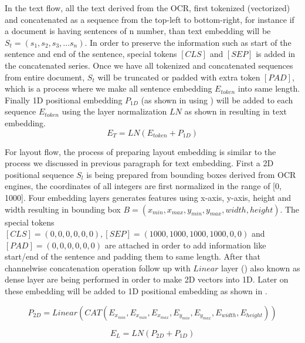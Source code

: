 In the text flow, all the text derived from the OCR, first tokenized (vectorized) and concatenated as a sequence from the top-left to bottom-right, for instance if a document is having sentences of n number, than text embedding will be \(S_t= (s_1, s_2, s_3,...s_n)\). In order to preserve the information such as start of the sentence and end of the sentence, special tokens $[CLS]$ and $[SEP]$ is added in the concatenated series. Once we have all tokenized and concatenated sequences from entire document, $S_t$ will be truncated or padded with extra token $[PAD]$, which is a process where we make all sentence embedding $E_{token}$  into same length. Finally 1D positional embedding $P_{1D}$ (as shown in  using ) will be added to each sequence $E_{token}$ using the layer normalization $LN$ as shown in  resulting in text embedding.
\begin{equation}
    E_T = LN(E_{token} + P_{1D})
    \label{eq:text_embedding}
\end{equation}

For layout flow, the process of preparing layout embedding is similar to the process we discussed in previous paragraph for text embedding. First a 2D positional sequence $S_l$ is being prepared from bounding boxes derived from OCR engines, the coordinates of all integers are first normalized in the range of [0, 1000]. Four embedding layers generates features using x-axis, y-axis, height and width resulting in bounding box \(B = (x_{min}, x_{max}, y_{min}, y_{max}, width, height)\). The special tokens $[CLS] = (0,0,0,0,0,0), [SEP] = (1000, 1000, 1000, 1000, 0, 0)$ and $[PAD] = (0,0,0,0,0,0)$ are attached in order to add information like start/end of the sentence and padding them to same length. After that channelwise concatenation operation follow up with  $Linear$ layer () also known as dense layer are being performed in order to make 2D vectors into 1D. Later on these embedding will be added to 1D positional embedding as shown in .

\begin{equation}
    \label{eq:Linear_Layer}
    P_{2D} = Linear(CAT(E_{x_{min}}, E_{x_{min}}, E_{x_{max}}, E_{y_{min}}, E_{y_{max}}, E_{width}, E_{height}))
\end{equation}

\begin{equation}
    \label{eq:layout_embedding}
    E_L = LN(P_{2D} + P_{1D})
\end{equation}




